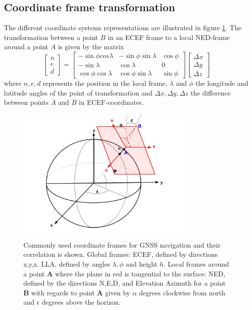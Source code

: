 \subsection{Coordinate frame transformation}
The different coordinate systems representations are illustrated in figure \ref{fig:CF}. The transformation between a point $B$ in an ECEF frame to a local NED-frame around a point $A$ is given by the matrix 
\begin{equation*}
\begin{bmatrix} n\\ e\\ d \end{bmatrix}=
\begin{bmatrix}
-\sin \phi cos \lambda & -\sin \phi \sin \lambda & \cos \phi \\
-\sin \lambda &\cos \lambda &0 \\
\cos \phi \cos \lambda & \cos \phi \sin \lambda & \sin \phi
\end{bmatrix}
\begin{bmatrix}
\Delta x \\ \Delta y \\ \Delta z
\end{bmatrix}
\end{equation*}
where $n,e,d$ represents the position in the local frame, $\lambda$ and $\phi$ the longitude and latitude angles of the point of transformation and $\Delta x, \Delta y,\Delta z$ the difference between points $A$ and $B$ in ECEF-coordinates.
\begin{figure}[!h]
\centering
\includegraphics[width=0.8\textwidth]{Background/allCS}
\caption{\label{fig:CF} Commonly used coordinate frames for GNSS navigation and their correlation is shown. Global frames: ECEF, defined by directions x,y,z. LLA, defined by angles $\lambda, \phi$ and height $h$. Local frames around a point {\color{blue} \bf A} where the plane in red is tangential to the surface: NED, defined by the directions {\color{red} N,E,D}, and Elevation Azimuth for a point {\color{blue} \bf B} with regards to point {\color{blue} \bf A} given by $\alpha$ degrees clockwise from north and $\epsilon$ degrees above the horizon.}
\end{figure}

